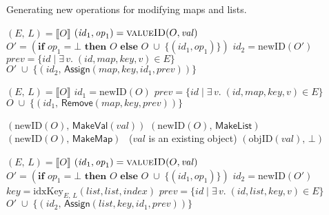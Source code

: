 \begin{algorithm}[t]
\caption{Generating new operations for modifying maps and lists.}\label{fig:pseudocode}
\noindent
\renewcommand\algorithmicindent{10pt}
\begin{minipage}[t]{0.5\textwidth}
\begin{algorithmic}
    \State $(E,\, L) = \llbracket O \rrbracket$
    \State $(\mathit{id}_1, \mathit{op}_1) = \Call{valueID}{O, \mathit{val}}$
    \State $O' = (\textbf{if } \mathit{op}_1 = \bot \textbf{ then } O \textbf{ else } 
        O \;\cup\; \big\{ (\mathit{id}_1, \mathit{op}_1) \big\})$
    \State $\mathit{id}_2 = \mathrm{newID}(O')$
    \State $\mathit{prev} = \{ \mathit{id} \mid \exists\,v.\; (\mathit{id}, \mathit{map}, \mathit{key}, v) \in E \}$
    \State \Return $O' \;\cup\; \big\{ (\mathit{id}_2,\, \mathsf{Assign}(\mathit{map}, \mathit{key}, \mathit{id}_1, \mathit{prev})) \big\}$
    \EndFunction\Statex

    \State $(E,\, L) = \llbracket O \rrbracket$
    \State $\mathit{id}_1 = \mathrm{newID}(O)$
    \State $\mathit{prev} = \{ \mathit{id} \mid \exists\,v.\; (\mathit{id}, \mathit{map}, \mathit{key}, v) \in E \}$
    \State \Return $O \;\cup\; \big\{ (\mathit{id}_1,\, \mathsf{Remove}(\mathit{map}, \mathit{key}, \mathit{prev})) \big\}$
    \EndFunction\Statex

    \State \Return $(\mathrm{newID}(O),\, \mathsf{MakeVal}(\mathit{val}))$
    \State \Return $(\mathrm{newID}(O),\, \mathsf{MakeList})$
    \State \Return $(\mathrm{newID}(O),\, \mathsf{MakeMap})$
    \Else ~($\mathit{val}$ is an existing object)
    \State \Return $(\mathrm{objID}(\mathit{val}),\, \bot)$
    \EndIf
    \EndFunction
\end{algorithmic}
\end{minipage}%
\begin{minipage}[t]{0.5\textwidth}
\begin{algorithmic}
    \State $(E,\, L) = \llbracket O \rrbracket$
    \State $(\mathit{id}_1, \mathit{op}_1) = \Call{valueID}{O, \mathit{val}}$
    \State $O' = (\textbf{if } \mathit{op}_1 = \bot \textbf{ then } O \textbf{ else } 
        O \;\cup\; \big\{ (\mathit{id}_1, \mathit{op}_1) \big\})$
    \State $\mathit{id}_2 = \mathrm{newID}(O')$
    \State $\mathit{key} = \mathrm{idxKey}_{E,\, L}(\mathit{list}, \mathit{list}, \mathit{index})$
    \State $\mathit{prev} = \{ \mathit{id} \mid \exists\,v.\; (\mathit{id}, \mathit{list}, \mathit{key}, v) \in E \}$
    \State \Return $O' \;\cup\; \big\{ (\mathit{id}_2,\, \mathsf{Assign}(\mathit{list}, \mathit{key}, \mathit{id}_1, \mathit{prev})) \big\}$
    \EndFunction\Statex


\end{algorithmic}
\end{minipage}
\end{algorithm}
